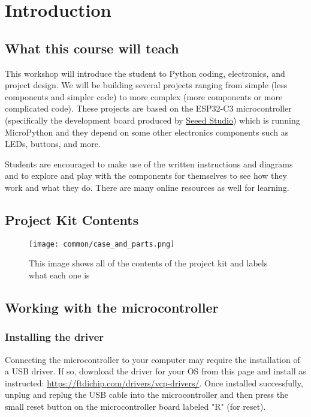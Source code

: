 \chapter{Introduction}
\section{What this course will teach}
This workshop will introduce the student to Python coding, electronics, and project
design. We will be building several projects ranging from simple (less components and
simpler code) to more complex (more components or more complicated code). These projects
are based on the ESP32-C3 microcontroller (specifically the development board produced by
\href{https://www.seeedstudio.com/Seeed-XIAO-ESP32C3-p-5431.html}{Seeed Studio}) which is
running MicroPython and they depend on some other electronics components such as LEDs,
buttons, and more.

Students are encouraged to make use of the written instructions and diagrams and to
explore and play with the components for themselves to see how they work and what
they do. There are many online resources as well for learning.

\section{Project Kit Contents}
\begin{figure}[H]
\centering
    \texttt{[image: common/case\_and\_parts.png]}
    \caption{This image shows all of the contents of the project kit and labels what each one is}
\end{figure}

\section{Working with the microcontroller}
\subsection{Installing the driver}
Connecting the microcontroller to your computer may require the installation of a
USB driver. If so, download the driver for your OS from this page and install as instructed:
\url{https://ftdichip.com/drivers/vcp-drivers/}. Once installed successfully, unplug and replug
the USB cable into the microcontroller and then press the small reset button on the
microcontroller board labeled "R" (for reset).

